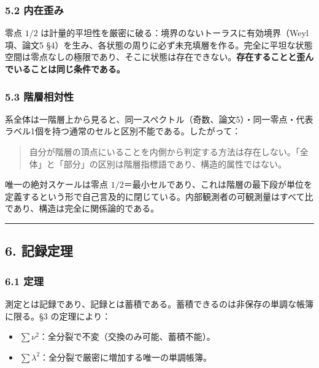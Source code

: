 \documentclass[
]{ltjsarticle}
\providecommand{\tightlist}{%
  \setlength{\itemsep}{0pt}\setlength{\parskip}{0pt}}
\begin{document}
\subsubsection{5.2 内在歪み}\label{ux5185ux5728ux6b6aux307f}

零点 \(1/2\)
は計量的平坦性を厳密に破る：境界のないトーラスに有効境界（Weyl 項、論文5
§4）を生み、各状態の周りに必ず未充填層を作る。完全に平坦な状態空間は零点なしの極限であり、そこに状態は存在できない。\textbf{存在することと歪んでいることは同じ条件である。}

\subsubsection{5.3 階層相対性}\label{ux968eux5c64ux76f8ux5bfeux6027}

系全体は一階層上から見ると、同一スペクトル（奇数、論文5）・同一零点・代表ラベル1個を持つ通常のセルと区別不能である。したがって：

\begin{quote}
自分が階層の頂点にいることを内側から判定する方法は存在しない。「全体」と「部分」の区別は階層指標語であり、構造的属性ではない。
\end{quote}

唯一の絶対スケールは零点
\(1/2\)＝最小セルであり、これは階層の最下段が単位を定義するという形で自己言及的に閉じている。内部観測者の可観測量はすべて比であり、構造は完全に関係論的である。

\begin{center}\rule{0.5\linewidth}{0.5pt}\end{center}

\subsection{6. 記録定理}\label{ux8a18ux9332ux5b9aux7406}

\subsubsection{6.1 定理}\label{ux5b9aux7406}

測定とは記録であり、記録とは蓄積である。蓄積できるのは非保存の単調な帳簿に限る。§3
の定理により：

\begin{itemize}
\tightlist
\item
  \(\sum\nu^2\)：全分裂で不変（交換のみ可能、蓄積不能）。
\item
  \(\sum\lambda^2\)：全分裂で厳密に増加する唯一の単調帳簿。
\end{itemize}
\end{document}
